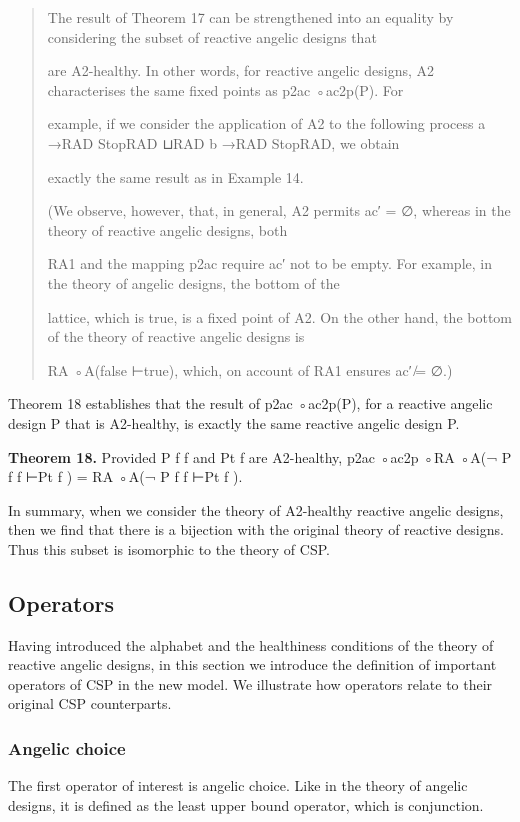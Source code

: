 \documentclass[11pt]{article}
\begin{document}
\begin{quote}\small\raggedright
The result of Theorem 17 can be strengthened into an equality by considering the subset of reactive angelic designs that
\par
are A2-healthy. In other words, for reactive angelic designs, A2 characterises the same fixed points as p2ac ◦ac2p(P). For
\par
example, if we consider the application of A2 to the following process a →RAD StopRAD ⊔RAD b →RAD StopRAD, we obtain
\par
exactly the same result as in Example 14.
\par
(We observe, however, that, in general, A2 permits ac′ = ∅, whereas in the theory of reactive angelic designs, both
\par
RA1 and the mapping p2ac require ac′ not to be empty. For example, in the theory of angelic designs, the bottom of the
\par
lattice, which is true, is a fixed point of A2. On the other hand, the bottom of the theory of reactive angelic designs is
\par
RA ◦A(false ⊢true), which, on account of RA1 ensures ac′ ̸= ∅.)
\end{quote}

Theorem 18 establishes that the result of p2ac ◦ac2p(P), for a reactive angelic design P that is A2-healthy, is exactly the same reactive angelic design P.

\noindent\textbf{Theorem 18.} Provided P f f and Pt f are A2-healthy, p2ac ◦ac2p ◦RA ◦A(¬ P f f ⊢Pt f ) = RA ◦A(¬ P f f ⊢Pt f ).


In summary, when we consider the theory of A2-healthy reactive angelic designs, then we find that there is a bijection with the original theory of reactive designs. Thus this subset is isomorphic to the theory of CSP.

\subsection{Operators}
Having introduced the alphabet and the healthiness conditions of the theory of reactive angelic designs, in this section we introduce the definition of important operators of CSP in the new model. We illustrate how operators relate to their original CSP counterparts.

\subsubsection{Angelic choice}
The first operator of interest is angelic choice. Like in the theory of angelic designs, it is defined as the least upper bound operator, which is conjunction.
\end{document}
